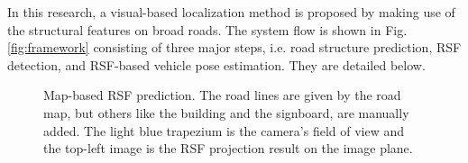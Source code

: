 \documentclass[letterpaper, 10 pt, conference]{ieeeconf}  %
\begin{document}
In this research, a visual-based localization method is proposed by making use of the structural features on broad roads. The system flow is shown in Fig. \ref{fig:framework} consisting of three major steps, i.e. road structure prediction, RSF detection, and RSF-based vehicle pose estimation. They are detailed below.

\begin{figure}
  \centering
  \caption{Map-based RSF prediction. The road lines are given by the road map, but others like the building and the signboard, are manually added. The light blue trapezium is the camera's field of view and the top-left image is the RSF projection result on the image plane.}
  \label{fig:map_based_prediction}
\end{figure}
\end{document}
